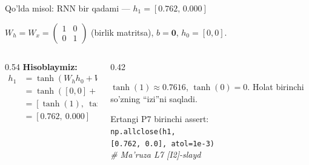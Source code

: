 \documentclass[aspectratio=169,11pt]{beamer}
\begin{document}
%
\begin{frame}{Qo'lda misol: RNN bir qadami --- $h_1=[0.762,\,0.000]$}
  \begin{tcolorbox}[defbox,title={$h_0=[0,0]$;\ $W_h=I$,\ $W_x=I$;\ $x_1=[1,0]$}]
    \small
    $W_h=W_x=\left(\begin{smallmatrix}1&0\\0&1\end{smallmatrix}\right)$ (birlik matritsa),
    \; $b=\mathbf{0}$, \; $h_0=[0,0]$.
  \end{tcolorbox}
  \vspace{0.2em}
  \begin{columns}[T]
    \begin{column}{0.54\textwidth}
      \textbf{Hisoblaymiz:}
      \begin{align*}
        h_1 &= \tanh(W_h h_0 + W_x x_1)\\
            &= \tanh([0,0] + [1,0])\\
            &= [\tanh(1),\ \tanh(0)]\\
            &= \mathbf{[0.762,\ 0.000]}
      \end{align*}
    \end{column}
    \begin{column}{0.42\textwidth}
      \begin{tcolorbox}[okbox,top=2pt,bottom=2pt]
        \footnotesize
        $\tanh(1)\approx 0.7616$, $\tanh(0)=0$. Holat birinchi so'zning
        ``izi''ni saqladi.
      \end{tcolorbox}
      \vspace{3pt}
      \footnotesize\color{halfgray}
      Ertangi P7 birinchi assert:\\
      \texttt{np.allclose(h1,}\\
      \texttt{\phantom{xx}[0.762, 0.0], atol=1e-3)}\\
      \textit{\# Ma'ruza L7 [I2]-slayd}
    \end{column}
  \end{columns}
\end{frame}
\end{document}
